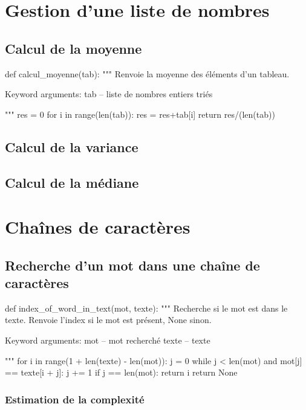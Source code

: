 \documentclass[10pt]{article}
\begin{document}
\section{Gestion d'une liste de nombres}
\subsection{Calcul de la moyenne}
\begin{py}
\begin{python}
def calcul_moyenne(tab):
    """ Renvoie la moyenne des éléments d'un tableau.
    
    Keyword arguments:
    tab -- liste de nombres entiers triés
    
    """
    res = 0
    for i in range(len(tab)):
        res = res+tab[i]
    return res/(len(tab))
\end{python}
\end{py}    
\subsection{Calcul de la variance}
\subsection{Calcul de la médiane} %

\section{Chaînes de caractères}
\subsection{Recherche d'un mot dans une chaîne de caractères}

\begin{py}
\begin{python}
def index_of_word_in_text(mot, texte):
    """ Recherche si le mot est dans le texte.
    Renvoie l'index si le mot est présent, None sinon.
    
    Keyword arguments:
    mot -- mot recherché
    texte -- texte
    
    """
    for i in range(1 + len(texte) - len(mot)):
        j = 0
        while j < len(mot) and mot[j] == texte[i + j]:
            j += 1
        if j == len(mot):
            return i
    return None
\end{python}
\end{py}
\subsubsection*{Estimation de la complexité}
\end{document}
